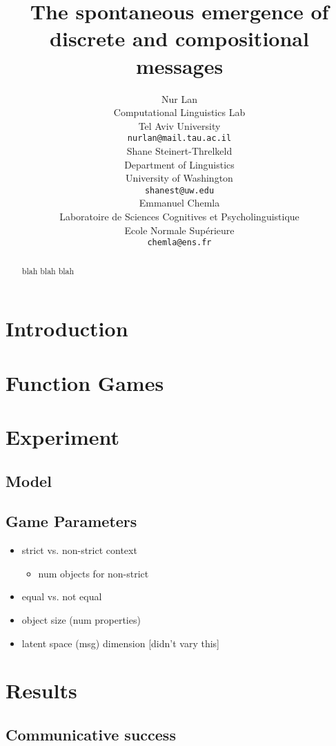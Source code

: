\documentclass[11pt,a4paper]{article}
\title{The spontaneous emergence of discrete and compositional messages}
\author{Nur Lan \\
  Computational Linguistics Lab \\
  Tel Aviv University \\
  \texttt{nurlan@mail.tau.ac.il} \\\And
  Shane Steinert-Threlkeld \\
  Department of Linguistics \\
  University of Washington \\
  \texttt{shanest@uw.edu} \\\And
  Emmanuel Chemla \\
  Laboratoire de Sciences Cognitives et Psycholinguistique \\
  Ecole Normale Sup\'erieure \\
  \texttt{chemla@ens.fr}}
\date{}
\begin{document}
\maketitle

\begin{abstract}
	blah blah blah
\end{abstract}

\section{Introduction}

\section{Function Games}

\section{Experiment}

\subsection{Model}

\subsection{Game Parameters}

\begin{itemize}
	\item strict vs. non-strict context
		\begin{itemize}
			\item num objects for non-strict
		\end{itemize}
	\item equal vs. not equal
	\item object size (num properties)
	\item latent space (msg) dimension [didn't vary this]
\end{itemize}

\section{Results}

\subsection{Communicative success}
\end{document}

